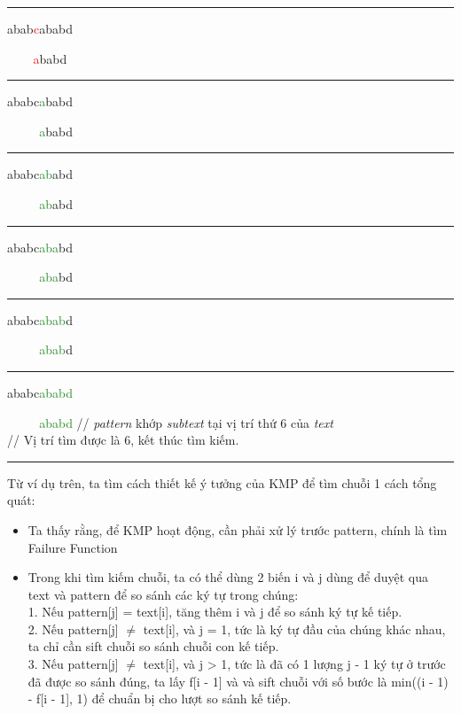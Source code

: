 \documentclass[a4paper,11pt]{article}
\begin{document}
			\vspace*{2mm}
			\hrule
			abab\textcolor{red}{c}ababd
			
			\textcolor{white}{abab}\textcolor{red}{a}babd 		

			\vspace*{2mm}
			\hrule
			ababc\textcolor{ForestGreen}{a}babd
			
			\textcolor{white}{ababc}\textcolor{ForestGreen}{a}babd 

			\vspace*{2mm}
			\hrule
			ababc\textcolor{ForestGreen}{ab}abd
			
			\textcolor{white}{ababc}\textcolor{ForestGreen}{ab}abd 

			\vspace*{2mm}
			\hrule
			ababc\textcolor{ForestGreen}{aba}bd
			
			\textcolor{white}{ababc}\textcolor{ForestGreen}{aba}bd 

			\vspace*{2mm}
			\hrule
			ababc\textcolor{ForestGreen}{abab}d
			
			\textcolor{white}{ababc}\textcolor{ForestGreen}{abab}d 

			\vspace*{2mm}
			\hrule
			ababc\textcolor{ForestGreen}{ababd}
			
			\textcolor{white}{ababc}\textcolor{ForestGreen}{ababd} 				\hspace*{0.8cm} // \textit{pattern} khớp \textit{subtext} tại vị trí thứ 6 của \textit{text}\\
															\hspace*{2.9cm} // Vị trí tìm được là 6, kết thúc tìm kiếm.
			
			\vspace*{2mm}
			\hrule			
					
			Từ ví dụ trên, ta tìm cách thiết kế ý tưởng của KMP để tìm chuỗi 1 cách tổng quát:
			\begin{itemize}
				\item Ta thấy rằng, để KMP hoạt động, cần phải xử lý trước pattern, chính là tìm Failure Function
				\item Trong khi tìm kiếm chuỗi, ta có thể dùng 2 biến i và j dùng để duyệt qua text và pattern để so sánh các ký tự trong chúng: \\
				1. Nếu pattern[j] = text[i], tăng thêm i và j để so sánh ký tự kế tiếp. \\
				2. Nếu pattern[j] $\neq$ text[i], và j = 1, tức là ký tự đầu của chúng khác nhau, ta chỉ cần sift chuỗi so sánh chuỗi con kế tiếp.\\
				3. Nếu pattern[j] $\neq$ text[i], và j > 1, tức là đã có 1 lượng j - 1 ký tự ở trước đã được so sánh đúng, ta lấy f[i - 1] 
				và và sift chuỗi với số bước là min((i - 1) - f[i - 1], 1) để chuẩn bị cho lượt so sánh kế tiếp.
			\end{itemize}
			
\end{document}
